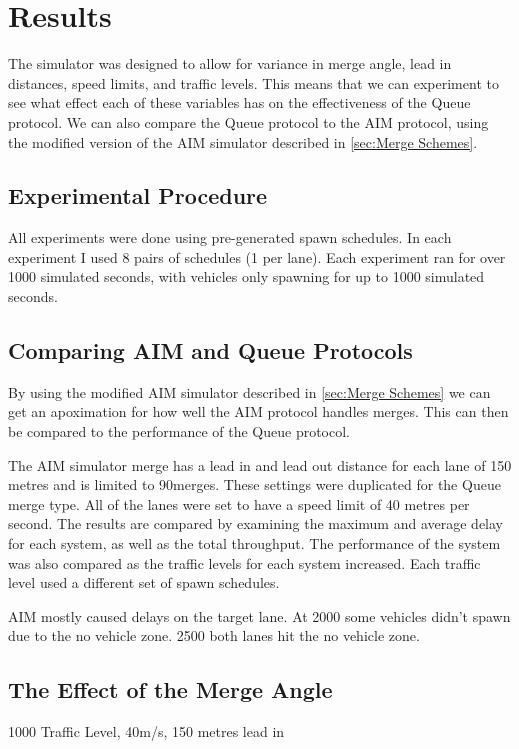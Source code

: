 \chapter{Results}
\label{cha:Results}
The simulator was designed to allow for variance in merge angle, lead in distances, speed limits, and traffic levels. This means that we can experiment to see what effect each of these variables has on the effectiveness of the Queue protocol. We can also compare the Queue protocol to the AIM protocol, using the modified version of the AIM simulator described in \ref{sec:Merge Schemes}.

\section{Experimental Procedure}
\label{sec:Experimental Procedure}
All experiments were done using pre-generated spawn schedules. In each experiment I used 8 pairs of schedules (1 per lane). Each experiment ran for over 1000 simulated seconds, with vehicles only spawning for up to 1000 simulated seconds.

\section{Comparing AIM and Queue Protocols}
\label{sec:Comparing AIM and Queue Protocols}
By using the modified AIM simulator described in \ref{sec:Merge Schemes} we can get an apoximation for how well the AIM protocol handles merges. This can then be compared to the performance of the Queue protocol. 

The AIM simulator merge has a lead in and lead out distance for each lane of 150 metres and is limited to 90\degree merges. These settings were duplicated for the Queue merge type. All of the lanes were set to have a speed limit of 40 metres per second. The results are compared by examining the maximum and average delay for each system, as well as the total throughput. The performance of the system was also compared as the traffic levels for each system increased. Each traffic level used a different set of spawn schedules.

AIM mostly caused delays on the target lane. At 2000 some vehicles didn't spawn due to the no vehicle zone. 2500 both lanes hit the no vehicle zone.

\section{The Effect of the Merge Angle}
\label{sec:The Effect of the Merge Angle}
1000 Traffic Level, 40m/s, 150 metres lead in

